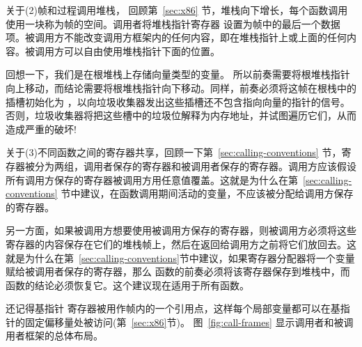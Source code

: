 \documentclass[11pt]{book}
\begin{document}

关于(2)帧和过程调用堆栈，
 回顾第~\ref{sec:x86} 节，堆栈向下增长，每个函数调用使用一块称为帧的空间。调用者将堆栈指针寄存器
 设置为帧中的最后一个数据项。被调用方不能改变调用方框架内的任何内容，即在堆栈指针上或上面的任何内容。被调用方可以自由使用堆栈指针下面的位置。

回想一下，我们是在根堆栈上存储向量类型的变量。
所以前奏需要将根堆栈指针  向上移动，而结论需要将根堆栈指针向下移动。同样，前奏必须将这帧在根栈中的插槽初始化为  ，以向垃圾收集器发出这些插槽还不包含指向向量的指针的信号。否则，垃圾收集器将把这些槽中的垃圾位解释为内存地址，并试图遍历它们，从而造成严重的破坏!

关于(3)不同函数之间的寄存器共享，回顾一下第~\ref{sec:calling-conventions} 节，寄存器被分为两组，调用者保存的寄存器和被调用者保存的寄存器。调用方应该假设所有调用方保存的寄存器被调用方用任意值覆盖。这就是为什么在第~\ref{sec:calling-conventions} 节中建议，在函数调用期间活动的变量，不应该被分配给调用方保存的寄存器。

另一方面，如果被调用方想要使用被调用方保存的寄存器，则被调用方必须将这些寄存器的内容保存在它们的堆栈帧上，然后在返回给调用方之前将它们放回去。这就是为什么在第~\ref{sec:calling-conventions}节中建议，如果寄存器分配器将一个变量赋给被调用者保存的寄存器，那么  函数的前奏必须将该寄存器保存到堆栈中，而  函数的结论必须恢复它。这个建议现在适用于所有函数。

还记得基指针 寄存器被用作帧内的一个引用点，这样每个局部变量都可以在基指针的固定偏移量处被访问(第~\ref{sec:x86}节)。
%
图~\ref{fig:call-frames} 显示调用者和被调用者框架的总体布局。
\end{document}
